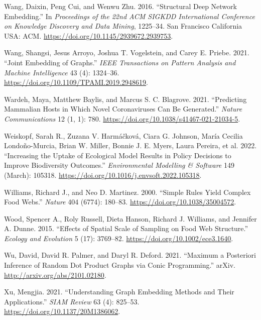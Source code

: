 \documentclass[
  letterpaper,
  DIV=11,
  numbers=noendperiod]{scrartcl}
\newlength{\cslhangindent}
\newlength{\cslentryspacingunit} %
\newenvironment{CSLReferences}[2] %
 {%
  \setlength{\parindent}{0pt}
  \ifodd #1
  \let\oldpar\par
  \def\par{\hangindent=\cslhangindent\oldpar}
  \fi
  \setlength{\parskip}{#2\cslentryspacingunit}
 }%
 {}
\begin{document}
\begin{CSLReferences}{1}{0}
\leavevmode{}%
Wang, Daixin, Peng Cui, and Wenwu Zhu. 2016. {``Structural {Deep Network
Embedding}.''} In \emph{Proceedings of the 22nd {ACM SIGKDD
International Conference} on {Knowledge Discovery} and {Data Mining}},
1225--34. {San Francisco California USA}: {ACM}.
\url{https://doi.org/10.1145/2939672.2939753}.

\leavevmode{}%
Wang, Shangsi, Jesus Arroyo, Joshua T. Vogelstein, and Carey E. Priebe.
2021. {``Joint {Embedding} of {Graphs}.''} \emph{IEEE Transactions on
Pattern Analysis and Machine Intelligence} 43 (4): 1324--36.
\url{https://doi.org/10.1109/TPAMI.2019.2948619}.

\leavevmode{}%
Wardeh, Maya, Matthew Baylis, and Marcus S. C. Blagrove. 2021.
{``Predicting Mammalian Hosts in Which Novel Coronaviruses Can Be
Generated.''} \emph{Nature Communications} 12 (1, 1): 780.
\url{https://doi.org/10.1038/s41467-021-21034-5}.

\leavevmode{}%
Weiskopf, Sarah R., Zuzana V. Harmáčková, Ciara G. Johnson, María
Cecilia Londoño-Murcia, Brian W. Miller, Bonnie J. E. Myers, Laura
Pereira, et al. 2022. {``Increasing the Uptake of Ecological Model
Results in Policy Decisions to Improve Biodiversity Outcomes.''}
\emph{Environmental Modelling \& Software} 149 (March): 105318.
\url{https://doi.org/10.1016/j.envsoft.2022.105318}.

\leavevmode{}%
Williams, Richard J., and Neo D. Martinez. 2000. {``Simple Rules Yield
Complex Food Webs.''} \emph{Nature} 404 (6774): 180--83.
\url{https://doi.org/10.1038/35004572}.

\leavevmode{}%
Wood, Spencer A., Roly Russell, Dieta Hanson, Richard J. Williams, and
Jennifer A. Dunne. 2015. {``Effects of Spatial Scale of Sampling on Food
Web Structure.''} \emph{Ecology and Evolution} 5 (17): 3769--82.
\url{https://doi.org/10.1002/ece3.1640}.

\leavevmode{}%
Wu, David, David R. Palmer, and Daryl R. Deford. 2021. {``Maximum a
{Posteriori Inference} of {Random Dot Product Graphs} via {Conic
Programming}.''} {arXiv}. \url{http://arxiv.org/abs/2101.02180}.

\leavevmode{}%
Xu, Mengjia. 2021. {``Understanding {Graph Embedding Methods} and {Their
Applications}.''} \emph{SIAM Review} 63 (4): 825--53.
\url{https://doi.org/10.1137/20M1386062}.


\end{CSLReferences}
\end{document}
